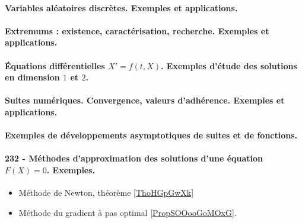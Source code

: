 \paragraph{Variables aléatoires discrètes. Exemples et applications.}
\paragraph{Extremums : existence, caractérisation, recherche. Exemples et applications.}
\paragraph{Équations différentielles $X' = f (t , X )$. Exemples d'étude des solutions en dimension $1$ et $2$.}
\paragraph{Suites numériques. Convergence, valeurs d'adhérence. Exemples et applications.}
\paragraph{Exemples de développements asymptotiques de suites et de fonctions.}
\paragraph{232 - Méthodes d'approximation des solutions d’une équation $F(X)=0$. Exemples.}
\begin{itemize}
    \item Méthode de Newton, théorème \ref{ThoHGpGwXk}
    \item Méthode du gradient à pas optimal \ref{PropSOOooGoMOxG}.
\end{itemize}
